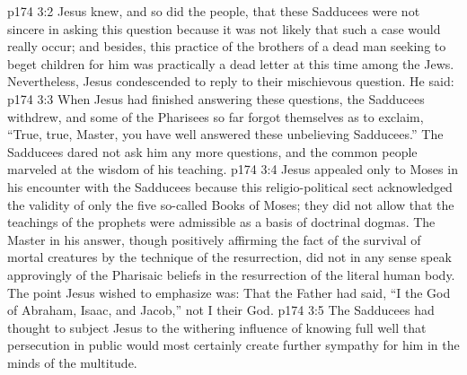 \vs p174 3:2 Jesus knew, and so did the people, that these Sadducees were not sincere in asking this question because it was not likely that such a case would really occur; and besides, this practice of the brothers of a dead man seeking to beget children for him was practically a dead letter at this time among the Jews. Nevertheless, Jesus condescended to reply to their mischievous question. He said: 
\vs p174 3:3 When Jesus had finished answering these questions, the Sadducees withdrew, and some of the Pharisees so far forgot themselves as to exclaim, “True, true, Master, you have well answered these unbelieving Sadducees.” The Sadducees dared not ask him any more questions, and the common people marveled at the wisdom of his teaching.
\vs p174 3:4 \pc Jesus appealed only to Moses in his encounter with the Sadducees because this religio\hyp{}political sect acknowledged the validity of only the five so\hyp{}called Books of Moses; they did not allow that the teachings of the prophets were admissible as a basis of doctrinal dogmas. The Master in his answer, though positively affirming the fact of the survival of mortal creatures by the technique of the resurrection, did not in any sense speak approvingly of the Pharisaic beliefs in the resurrection of the literal human body. The point Jesus wished to emphasize was: That the Father had said, “I  the God of Abraham, Isaac, and Jacob,” not I  their God.
\vs p174 3:5 The Sadducees had thought to subject Jesus to the withering influence of  knowing full well that persecution in public would most certainly create further sympathy for him in the minds of the multitude.
